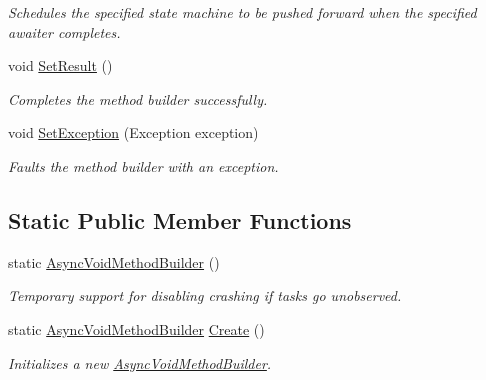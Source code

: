 \begin{DoxyCompactItemize}
\begin{DoxyCompactList}\small\item\em Schedules the specified state machine to be pushed forward when the specified awaiter completes. \end{DoxyCompactList}\item 
void \hyperlink{struct_system_1_1_runtime_1_1_compiler_services_1_1_async_void_method_builder_acef1f52e68e094163859f1d3a891a9af}{Set\+Result} ()
\begin{DoxyCompactList}\small\item\em Completes the method builder successfully.\end{DoxyCompactList}\item 
void \hyperlink{struct_system_1_1_runtime_1_1_compiler_services_1_1_async_void_method_builder_a3aaedab49b43335eebad1a9d3fc3dab5}{Set\+Exception} (Exception exception)
\begin{DoxyCompactList}\small\item\em Faults the method builder with an exception.\end{DoxyCompactList}\end{DoxyCompactItemize}
\subsection*{Static Public Member Functions}
\begin{DoxyCompactItemize}
\item 
static \hyperlink{struct_system_1_1_runtime_1_1_compiler_services_1_1_async_void_method_builder_a59bcbc32c01ba5cc5247fc9f2be62fd1}{Async\+Void\+Method\+Builder} ()
\begin{DoxyCompactList}\small\item\em Temporary support for disabling crashing if tasks go unobserved.\end{DoxyCompactList}\item 
static \hyperlink{struct_system_1_1_runtime_1_1_compiler_services_1_1_async_void_method_builder}{Async\+Void\+Method\+Builder} \hyperlink{struct_system_1_1_runtime_1_1_compiler_services_1_1_async_void_method_builder_a235983bbb3e696c5831af5f6ed093994}{Create} ()
\begin{DoxyCompactList}\small\item\em Initializes a new \hyperlink{struct_system_1_1_runtime_1_1_compiler_services_1_1_async_void_method_builder}{Async\+Void\+Method\+Builder}.\end{DoxyCompactList}\end{DoxyCompactItemize}
